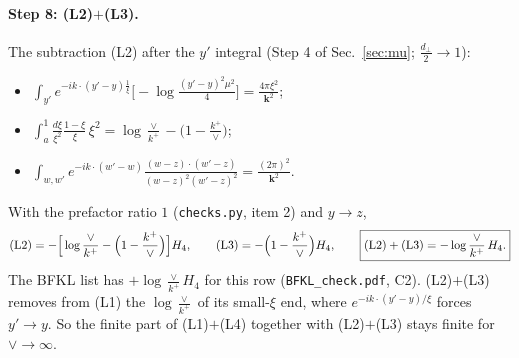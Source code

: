 \documentclass[10pt]{article}
\numberwithin{equation}{section}
\begin{document}
\paragraph{Step 8: (L2)$+$(L3).} The subtraction (L2) after the $y'$ integral (Step 4 of Sec.~\ref{sec:mu}; $\frac{d_\perp}{2}\to1$):
\begin{itemize}
\item $\int_{y'}e^{-ik\cdot(y'-y)\frac1\xi}\big[-\log\frac{(y'-y)^2\mu^2}{4}\big]=\frac{4\pi\xi^2}{\mathbf k^2}$;
\item $\int_a^1\frac{d\xi}{\xi^2}\frac{1-\xi}{\xi}\,\xi^2=\log\frac{\vee}{k^+}-\big(1-\frac{k^+}{\vee}\big)$;
\item $\int_{w,w'}e^{-ik\cdot(w'-w)}\frac{(w-z)\cdot(w'-z)}{(w-z)^2(w'-z)^2}=\frac{(2\pi)^2}{\mathbf k^2}$.
\end{itemize}
With the prefactor ratio $1$ (\texttt{checks.py}, item 2) and $y\to z$,
\begin{equation}
({\rm L2})=-\Big[\log\frac{\vee}{k^+}-\Big(1-\frac{k^+}{\vee}\Big)\Big]H_4,\qquad({\rm L3})=-\Big(1-\frac{k^+}{\vee}\Big)H_4,\qquad\boxed{({\rm L2})+({\rm L3})=-\log\frac{\vee}{k^+}\,H_4.}
\end{equation}
The BFKL list has $+\log\frac{\vee}{k^+}H_4$ for this row (\texttt{BFKL\_check.pdf}, C2). (L2)$+$(L3) removes from (L1) the $\log\frac{\vee}{k^+}$ of its small-$\xi$ end, where $e^{-ik\cdot(y'-y)/\xi}$ forces $y'\to y$. So the finite part of (L1)$+$(L4) together with (L2)$+$(L3) stays finite for $\vee\to\infty$.
\end{document}
